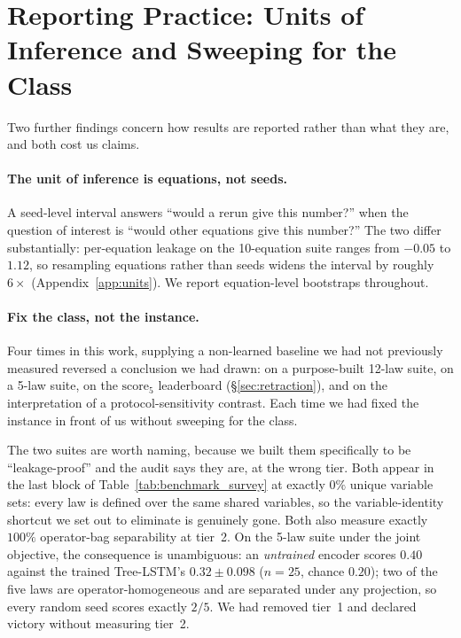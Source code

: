 \section{Reporting Practice: Units of Inference and Sweeping for the Class}
\label{sec:reporting}

Two further findings concern how results are reported rather than what they are, and both cost us
claims.

\paragraph{The unit of inference is equations, not seeds.} A seed-level interval answers ``would a
rerun give this number?'' when the question of interest is ``would other equations give this
number?'' The two differ substantially: per-equation leakage on the 10-equation suite ranges from
$-0.05$ to $1.12$, so resampling equations rather than seeds widens the interval by roughly
$6\times$ (Appendix~\ref{app:units}). We report equation-level bootstraps throughout.

\paragraph{Fix the class, not the instance.} Four times in this work, supplying a non-learned
baseline we had not previously measured reversed a conclusion we had drawn: on a purpose-built
12-law suite, on a 5-law suite, on the $\mathrm{score}_5$ leaderboard (\S\ref{sec:retraction}), and
on the interpretation of a protocol-sensitivity contrast. Each time we had fixed the instance in
front of us without sweeping for the class.

The two suites are worth naming, because we built them specifically to be ``leakage-proof'' and the
audit says they are, at the wrong tier. Both appear in the last block of
Table~\ref{tab:benchmark_survey} at exactly $0\%$ unique variable sets: every law is defined over
the same shared variables, so the variable-identity shortcut we set out to eliminate is genuinely
gone. Both also measure exactly $100\%$ operator-bag separability at tier~2. On the 5-law suite under the joint objective, the consequence is
unambiguous: an \emph{untrained} encoder scores $0.40$ against the trained Tree-LSTM's
$0.32 \pm 0.098$ ($n{=}25$, chance $0.20$); two of the five laws are operator-homogeneous and are
separated under any projection, so every random seed scores exactly $2/5$. We had removed tier~1 and
declared victory without measuring tier~2.


